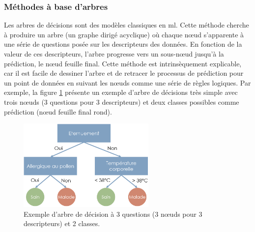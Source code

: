 \subsubsection{Méthodes à base d'arbres}
Les arbres de décisions sont des modèles classiques en \gls{ml}. Cette méthode cherche à produire un arbre (un graphe dirigé acyclique) où chaque nœud s'apparente à une série de questions posée sur les descripteurs des données. En fonction de la valeur de ces descripteurs, l'arbre progresse vers un sous-nœud jusqu'à la prédiction, le nœud feuille final. Cette méthode est intrinsèquement explicable, car il est facile de dessiner l'arbre et de retracer le processus de prédiction pour un point de données en suivant les nœuds comme une série de règles logiques. Par exemple, la figure \ref{fig:decision-tree} présente un exemple d'arbre de décisions très simple avec trois nœuds (3 questions pour 3 descripteurs) et deux classes possibles comme prédiction (nœud feuille final rond).
\begin{figure}[!htbp]
 \centering
 \includegraphics[width=0.6\textwidth]{figures/decision_tree.png}
 \caption[Exemple d'arbre de décision]{Exemple d'arbre de décision à 3 questions (3 nœuds pour 3 descripteurs) et 2 classes.}
 \label{fig:decision-tree}
\end{figure}

